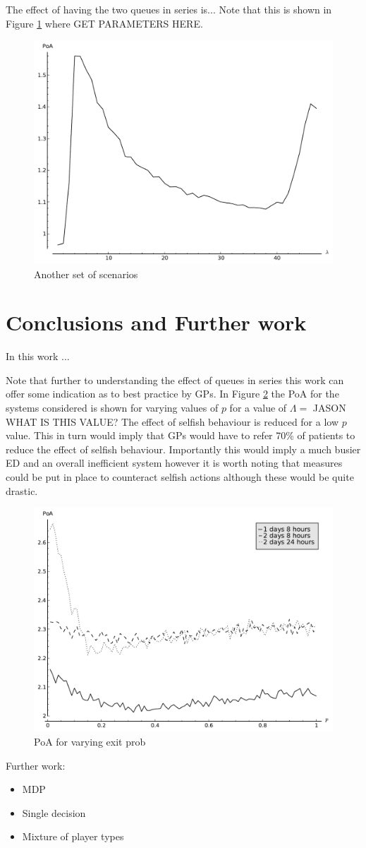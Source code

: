 \documentclass[12pt]{article}
\begin{document}
The effect of having the two queues in series is...
Note that this is shown in Figure \ref{dualpeak} where GET PARAMETERS HERE.

\begin{figure}[!hbtp]
    \begin{center}
        \includegraphics[width=.6\textwidth]{Images/DualPeak.pdf}
    \end{center}
    \caption{Another set of scenarios}\label{dualpeak}
\end{figure}

\section{Conclusions and Further work}\label{conclusions}

In this work ...

Note that further to understanding the effect of queues in series this work can offer some indication as to best practice by GPs.
In Figure \ref{anaexit} the PoA for the systems considered is shown for varying values of $p$ for a value of $\Lambda=$ JASON WHAT IS THIS VALUE?
The effect of selfish behaviour is reduced for a low $p$ value.
This in turn would imply that GPs would have to refer 70\% of patients to reduce the effect of selfish behaviour.
Importantly this would imply a much busier ED and an overall inefficient system however it is worth noting that measures could be put in place to counteract selfish actions although these would be quite drastic.

\begin{figure}[!hbtp]
    \begin{center}
        \includegraphics[width=.6\textwidth]{Images/AnaExit.pdf}
    \end{center}
    \caption{PoA for varying exit prob}\label{anaexit}
\end{figure}

Further work:

\begin{itemize}
    \item MDP
    \item Single decision
    \item Mixture of player types
\end{itemize}

\pagebreak


\end{document}
